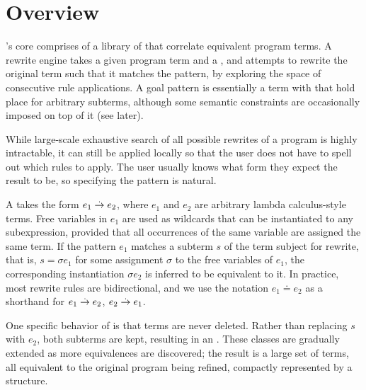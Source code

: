 \section{Overview}

\TransCal's core comprises of a library of  that correlate
equivalent program terms.
A rewrite engine takes a given program term and a ,
and attempts to rewrite the original term such that it matches the pattern,
by exploring the space of consecutive rule applications.
A goal pattern is essentially a term with  that hold place for
arbitrary subterms, although some semantic constraints are occasionally imposed
on top of it (see later).

While large-scale exhaustive search of all possible rewrites of a program
is highly intractable, it can still be applied locally so that
the user does not have to spell out which rules to apply.
The user usually knows what form they expect the result to be, so specifying
the pattern is natural.

A  takes the form $e_1 \overset{.}{\to} e_2$, where $e_1$
and $e_2$ are arbitrary lambda calculus-style terms.
Free variables in $e_1$ are used as wildcards that can be instantiated
to any subexpression, provided that all occurrences of the same variable
are assigned the same term.
If the pattern $e_1$ matches a subterm $s$ of the term subject for rewrite,
that is, $s=\sigma e_1$ for some assignment $\sigma$ to the free variables of $e_1$,
the corresponding instantiation $\sigma e_2$ is inferred to be equivalent to it.
In practice, most rewrite rules are bidirectional, and we use the notation
$e_1 \doteq e_2$ as a shorthand for $e_1 \overset{.}{\to} e_2$, $e_2 \overset{.}{\to} e_1$.

One specific behavior of \TransCal is that terms are never deleted.
Rather than replacing $s$ with $e_2$, both subterms are kept, resulting
in an .
These classes are gradually extended as more equivalences are discovered;
the result is a large set of terms, all equivalent to the original program
being refined, compactly represented by a 
structure.

